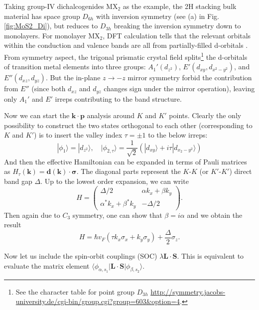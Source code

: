 Taking group-IV dichalcogenides MX$_2$ as the example, the 2H stacking bulk material has space group $D_{6h}$ with inversion symmetry (see (a) in Fig. \ref{fig:MoS2_Di}), but reduces to $D_{3h}$ breaking the inversion symmetry down to monolayers. For monolayer MX$_2$, DFT calculation tells that the relevant orbitals within the conduction and valence bands are all from partially-filled d-orbitals \cite{mattheiss1973band}. From symmetry aspect, the trigonal prismatic crystal field splits\footnote{See the character table for point group $D_{3h}$ \url{http://symmetry.jacobs-university.de/cgi-bin/group.cgi?group=603&option=4}.} the d-orbitals of transition metal elements into three groups: $A_1'(d_{z^2})$, $E'(d_{xy}, d_{x^2-y^2})$, and $E''(d_{xz}, d_{yz})$. But the in-plane $z\rightarrow-z$ mirror symmetry forbid the contribution from $E''$ (since both $d_{xz}$ and $d_{yz}$ changes sign under the mirror operation), leaving only $A_1'$ and $E'$ irreps contributing to the band structure.

Now we can start the $\bm k\cdot\bm p$ analysis around $K$ and $K'$ points. Clearly the only possibility to construct the two states orthogonal to each other (corresponding to $K$ and $K'$) is to insert the valley index $\tau=\pm1$ to the below irreps:
\begin{equation*}
    |\phi_1\rangle=|d_{z^2}\rangle, \quad|\phi_{2,\tau}\rangle=\dfrac{1}{\sqrt{2}}(|d_{xy}\rangle+i\tau|d_{x_2-y^2}\rangle)
\end{equation*}
And then the effective Hamiltonian can be expanded in terms of Pauli matrices as $H_\tau(\bm k)=\bm d(\bm k)\cdot\bm\sigma$. The diagonal parts represent the $K$-$K$ (or $K'$-$K'$) direct band gap $\Delta$. Up to the lowest order expansion, we can write
\begin{equation*}
    H=\begin{pmatrix}
        \Delta/2                 & \alpha k_x+\beta k_y \\
        \alpha^* k_x+\beta^* k_y & -\Delta/2
    \end{pmatrix}.
\end{equation*}
Then again due to $C_3$ symmetry, one can show that $\beta=i\alpha$ and we obtain the result
\begin{equation}\label{eq:MoS2 kdotp}
    H=\hbar v_F(\tau k_x\sigma_x+k_y\sigma_y)+\frac{\Delta}{2}\sigma_z.
\end{equation}

Now let us include the spin-orbit couplings (SOC) $\lambda\bm L\cdot\bm S$. This is equivalent to evaluate the matrix element $\langle \phi_{\alpha, s_1}|\bm L\cdot\bm S|\phi_{\beta, s_2}\rangle$.

